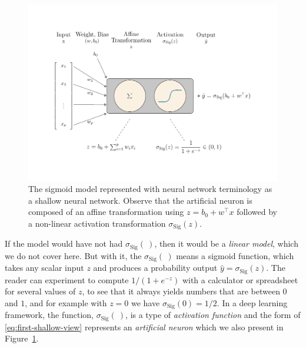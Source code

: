 \documentclass[12pt]{article}
\begin{document}
\begin{figure}[h]
\begin{center}
\includegraphics[scale=0.8, trim=0 50 0 50, clip]{figures/logistic_architecture_chapter_book.pdf}
\end{center}
\caption{The sigmoid model represented with neural network terminology as a shallow neural network. Observe that the artificial neuron is composed of an affine transformation using $z = b_0 + w^\top x$ followed by a non-linear activation transformation 
$\sigma_{\text{Sig}}(z)$.} %
\label{fig:niceneuron}
\end{figure}

If the model would have not had $\sigma_{\text{Sig}}(~)$, then it would be a {\em linear model}, which we do not cover here. But with it, the $\sigma_{\text{Sig}}(~)$ means a sigmoid function, which takes any scalar input $z$ and produces a probability output $\hat{y}=\sigma_{\text{Sig}}(z)$. The reader can experiment to compute $1/(1+e^{-z})$ with a calculator or spreadsheet for several values of $z$, to see that it always yields numbers that are between $0$ and $1$, and for example with $z=0$ we have $\sigma_{\text{Sig}}(0) = 1/2$. In a deep learning framework, the function, $\sigma_{\text{Sig}}(~)$, is a type of {\em activation function} and the form of \eqref{eq:first-shallow-view} represents an \textit{artificial neuron} which we also present in Figure~\ref{fig:niceneuron}. 
\end{document}
